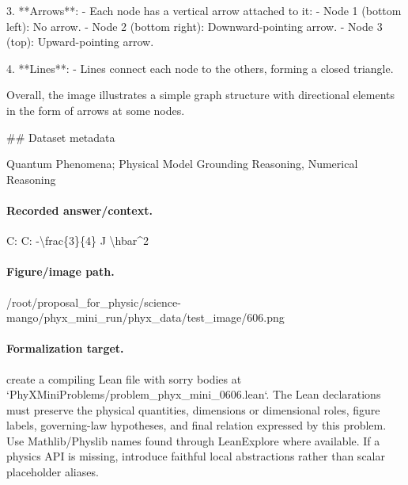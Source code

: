 3. **Arrows**:
   - Each node has a vertical arrow attached to it:
     - Node 1 (bottom left): No arrow.
     - Node 2 (bottom right): Downward-pointing arrow.
     - Node 3 (top): Upward-pointing arrow.

4. **Lines**:
   - Lines connect each node to the others, forming a closed triangle.

Overall, the image illustrates a simple graph structure with directional elements in the form of arrows at some nodes.

\#\# Dataset metadata

Quantum Phenomena; Physical Model Grounding Reasoning, Numerical Reasoning

\paragraph{Recorded answer/context.}
C: C: -\textbackslash{}frac\{3\}\{4\} J \textbackslash{}hbar\textasciicircum{}2

\paragraph{Figure/image path.}
/root/proposal\_for\_physic/science-mango/phyx\_mini\_run/phyx\_data/test\_image/606.png

\paragraph{Formalization target.}
create a compiling Lean file with sorry bodies at `PhyXMiniProblems/problem\_phyx\_mini\_0606.lean`. The Lean declarations must preserve the physical quantities, dimensions or dimensional roles, figure labels, governing-law hypotheses, and final relation expressed by this problem.
Use Mathlib/Physlib names found through LeanExplore where available. If a physics API is missing, introduce faithful local abstractions rather than scalar placeholder aliases.

